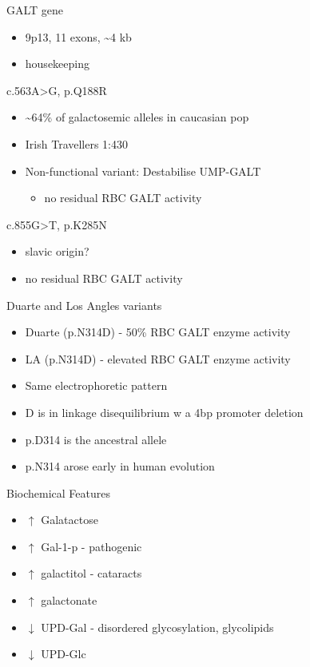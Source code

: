 \documentclass[presentation, smaller]{beamer}
\begin{document}
\begin{frame}[label={sec:orgheadline6}]{GALT gene}
\begin{itemize}
\item 9p13, 11 exons, \textasciitilde{}4 kb
\item housekeeping
\end{itemize}
\begin{block}{c.563A>G, p.Q188R}
\begin{itemize}
\item \textasciitilde{}64\% of galactosemic alleles in caucasian pop
\item Irish Travellers 1:430
\item Non-functional variant: Destabilise UMP-GALT
\begin{itemize}
\item no residual RBC GALT activity
\end{itemize}
\end{itemize}
\end{block}

\begin{block}{c.855G>T, p.K285N}
\begin{itemize}
\item slavic origin?
\item no residual RBC GALT activity
\end{itemize}
\end{block}
\end{frame}

\begin{frame}[label={sec:orgheadline7}]{Duarte and Los Angles variants}
\begin{itemize}
\item Duarte (p.N314D) - 50\% RBC GALT enzyme activity
\item LA (p.N314D) - elevated RBC GALT enzyme activity
\item Same electrophoretic pattern
\item D is in linkage disequilibrium w a 4bp promoter deletion
\item p.D314 is the ancestral allele
\item p.N314 arose early in human evolution
\end{itemize}
\end{frame}


\begin{frame}[label={sec:orgheadline8}]{Biochemical Features}
\begin{itemize}
\item \(\uparrow\)  Galatactose
\item \(\uparrow\) Gal-1-p - pathogenic
\item \(\uparrow\)  galactitol - cataracts
\item \(\uparrow\) galactonate
\item \(\downarrow\) UPD-Gal - disordered glycosylation, glycolipids
\item \(\downarrow\) UPD-Glc
\end{itemize}
\end{frame}
\end{document}
